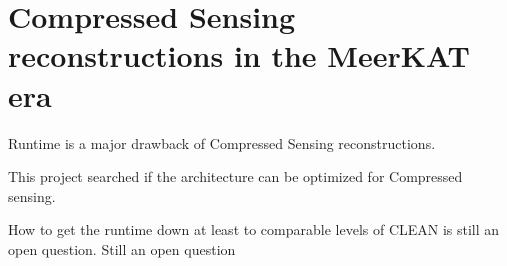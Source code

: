 \section{Compressed Sensing reconstructions in the MeerKAT era}
Runtime is a major drawback of Compressed Sensing reconstructions.

This project searched if the architecture can be optimized for Compressed sensing.

 How to get the runtime down at least to comparable levels of CLEAN is still an open question.
Still an open question








